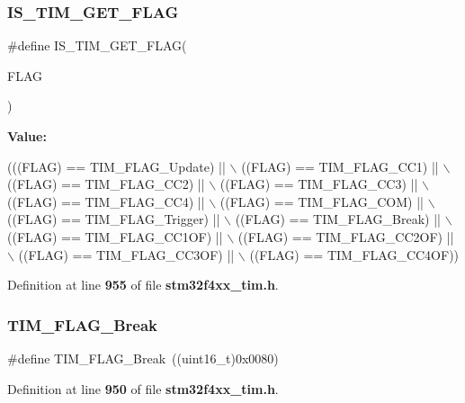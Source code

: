 \subsubsection{I\+S\+\_\+\+T\+I\+M\+\_\+\+G\+E\+T\+\_\+\+F\+L\+AG}
{\footnotesize\ttfamily \#define I\+S\+\_\+\+T\+I\+M\+\_\+\+G\+E\+T\+\_\+\+F\+L\+AG(\begin{DoxyParamCaption}\item[{}]{F\+L\+AG }\end{DoxyParamCaption})}

{\bfseries Value\+:}
\begin{DoxyCode}
(((FLAG) == TIM_FLAG_Update) || \(\backslash\)
                               ((FLAG) == TIM_FLAG_CC1) || \(\backslash\)
                               ((FLAG) == TIM_FLAG_CC2) || \(\backslash\)
                               ((FLAG) == TIM_FLAG_CC3) || \(\backslash\)
                               ((FLAG) == TIM_FLAG_CC4) || \(\backslash\)
                               ((FLAG) == TIM_FLAG_COM) || \(\backslash\)
                               ((FLAG) == TIM_FLAG_Trigger) || \(\backslash\)
                               ((FLAG) == TIM_FLAG_Break) || \(\backslash\)
                               ((FLAG) == TIM_FLAG_CC1OF) || \(\backslash\)
                               ((FLAG) == TIM_FLAG_CC2OF) || \(\backslash\)
                               ((FLAG) == TIM_FLAG_CC3OF) || \(\backslash\)
                               ((FLAG) == TIM_FLAG_CC4OF))
\end{DoxyCode}


Definition at line \textbf{ 955} of file \textbf{ stm32f4xx\+\_\+tim.\+h}.

\mbox{\label{group__TIM__Flags_ga166571a1d5ca2bfca5d923eaa22f6deb}} 
\subsubsection{T\+I\+M\+\_\+\+F\+L\+A\+G\+\_\+\+Break}
{\footnotesize\ttfamily \#define T\+I\+M\+\_\+\+F\+L\+A\+G\+\_\+\+Break~((uint16\+\_\+t)0x0080)}



Definition at line \textbf{ 950} of file \textbf{ stm32f4xx\+\_\+tim.\+h}.

\mbox{\label{group__TIM__Flags_gaa7eb8be054b9bd217a9abb1c8687cc55}} 
